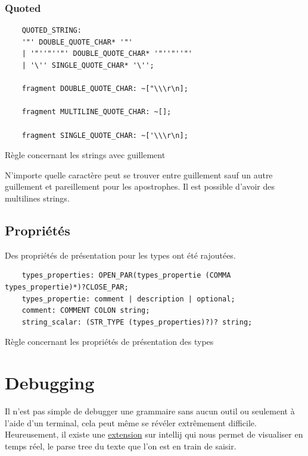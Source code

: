 \documentclass[
    iict, %
    il, %
]{heig-tb}
\begin{document}
\subsubsection{Quoted}

\begin{listing}[H]
    \begin{verbatim}
    QUOTED_STRING:
    '"' DOUBLE_QUOTE_CHAR* '"'
    | '"''"''"' DOUBLE_QUOTE_CHAR* '"''"''"'
    | '\'' SINGLE_QUOTE_CHAR* '\'';

    fragment DOUBLE_QUOTE_CHAR: ~["\\\r\n];

    fragment MULTILINE_QUOTE_CHAR: ~[];

    fragment SINGLE_QUOTE_CHAR: ~['\\\r\n];
    \end{verbatim}
    \caption{Règle concernant les strings avec guillement}
    \label{quoted-rule}
\end{listing}

N'importe quelle caractère peut se trouver entre guillement sauf un autre guillement et pareillement pour les apostrophes.
Il est possible d'avoir des multilines strings.

\subsection{Propriétés}

Des propriétés de présentation pour les types ont été rajoutées.

\begin{listing}[!ht]
    \begin{verbatim}
    types_properties: OPEN_PAR(types_propertie (COMMA types_propertie)*)?CLOSE_PAR;
    types_propertie: comment | description | optional;
    comment: COMMENT COLON string;
    string_scalar: (STR_TYPE (types_properties)?)? string;
    \end{verbatim}
    \caption{Règle concernant les propriétés de présentation des types}
    \label{types_properties-rule}
\end{listing}

\section{Debugging}

Il n'est pas simple de debugger une grammaire sans aucun outil ou seulement à l'aide d'un terminal, cela peut même se révéler extrêmement difficile.
Heureusement, il existe une \href{https://plugins.jetbrains.com/plugin/7358-antlr-v4}{extension} sur intellij qui nous permet de visualiser en temps réel, le parse tree du texte que l'on est en train de saisir.
\end{document}
